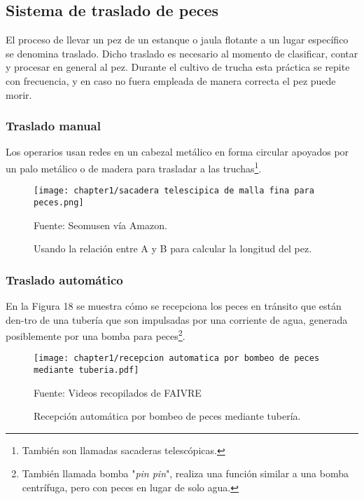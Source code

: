 \subsection{Sistema de traslado de peces}

El proceso de llevar un pez de un estanque o jaula flotante a un lugar específico se denomina traslado. Dicho traslado es necesario al momento de clasificar, contar y procesar en general al pez. Durante el cultivo de trucha esta práctica se repite con frecuencia, y en caso no fuera empleada de manera correcta el pez puede morir.

\subsubsection{Traslado manual}

Los operarios usan redes en un cabezal metálico en forma circular apoyados por un palo metálico o de madera para trasladar a las truchas\footnote{También son llamadas sacaderas telescópicas.}.

\begin{figure}[H]
	\centering
	\texttt{[image: chapter1/sacadera telescipica de malla fina para peces.png]}
	\caption{Usando la relación  entre A y B para calcular la longitud del pez.}
	Fuente: Seomusen vía Amazon.
	\label{fig:sacadera telescipica de malla fina para peces}
\end{figure}

\subsubsection{Traslado automático}

En la Figura 18 se muestra cómo se recepciona los peces en tránsito que están den-tro de una tubería que son impulsadas por una corriente de agua, generada posiblemente por una bomba para peces\footnote{También llamada bomba "\textit{pin pin}", realiza una función similar a una bomba centrífuga, pero con peces en lugar de solo agua.}.

\begin{figure}[H]
	\centering
	\texttt{[image: chapter1/recepcion automatica por bombeo de peces mediante tuberia.pdf]}
	\caption{Recepción automática por bombeo de peces mediante tubería.}
	Fuente: Videos recopilados de FAIVRE
	\label{fig:recepcion automatica por bombeo de peces mediante tuberia}
\end{figure}

